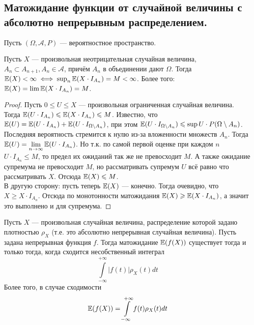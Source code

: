 \subsection{Матожидание функции от случайной величины с абсолютно непрерывным распределением.}
Пусть $(\Omega, \mathcal{A}, P)$ --- вероятностное пространство.
\begin{lemma}
    Пусть $X$ --- произвольная неотрицательная случайная величина, $A_n \subset A_{n + 1}, A_n \in \mathcal{A}$, причём $A_n$
    в объединении дают $\Omega$. Тогда $\mathbb{E}(X) < \infty \iff \operatorname{\mathop{\mathrm{sup}}}_{n}\mathbb{E}(X \cdot I_{A_n}) = M < \infty$. Более того:
    $\mathbb{E}(X) = \lim\mathbb{E}(X \cdot I_{A_n}) = M$.
\end{lemma}
\begin{proof}
    Пусть $0 \leq U \leq X$ --- произвольная ограниченная случайная величина. Тогда
    $\mathbb{E}(U \cdot I_{A_n}) \leqslant \mathbb{E}(X \cdot I_{A_n}) \leqslant M$. Известно, что
    $\mathbb{E}(U) = \mathbb{E}(U \cdot I_{A_n}) + \mathbb{E}(U \cdot I_{\Omega \setminus A_n})$, при этом
    $\mathbb{E}(U \cdot I_{\Omega \setminus A_n}) \leqslant \operatorname{\mathop{\mathrm{sup}}} U \cdot P(\Omega \setminus A_n)$. Последняя вероятность
    стремится к нулю из-за вложенности множеств $A_n$. Тогда $\mathbb{E}(U) = \lim\limits_{n \to \infty} \mathbb{E}(U \cdot I_{A_n})$.
    Но т.к. по самой первой оценке при каждом $n$ $U \cdot I_{A_n} \leq M$, то предел их ожиданий так же не превосходит $M$. А
    также ожидание супремума не превосходит $M$, но рассматривать супремум $U$ всё равно что рассматривать $X$. Отсюда
    $\mathbb{E}(X) \leqslant M$.\\
    В другую сторону: пусть теперь $\mathbb{E}(X)$ --- конечно. Тогда очевидно, что $X \geq X \cdot I_{A_n}$. Отсюда по монотонности
    матожидания $\mathbb{E}(X) \geqslant \mathbb{E}(X \cdot I_{A_n})$, а значит это выполнено и для супремума.
\end{proof}
\begin{proposal}
    Пусть $X$ --- произвольная случайная величина, распределение которой задано плотностью $\rho_X$ (т.е. это абсолютно непрерывная
    случайная величина). Пусть задана непрерывная функция $f$. Тогда матожидание $\mathbb{E}(f(X))$ существует тогда и только тогда, когда
    сходится несобственный интеграл
    \[
        \int\limits_{-\infty}^{+\infty} |f(t)|\rho_X(t)dt
    \]
    Более того, в случае сходимости
    \[
        \mathbb{E}(f(X)) = \int\limits_{-\infty}^{+\infty} f(t)\rho_X(t)dt
    \]
\end{proposal}
